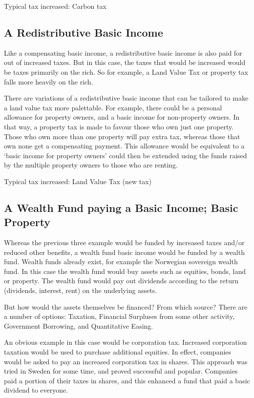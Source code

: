 \documentclass[]{tufte-handout}
\begin{document}
Typical tax increased: Carbon tax

\hypertarget{a-redistributive-basic-income}{%
\subsection{A Redistributive Basic
Income}\label{a-redistributive-basic-income}}

Like a compensating basic income, a redistributive basic income is also
paid for out of increased taxes. But in this case, the taxes that would
be increased would be taxes primarily on the rich. So for example, a
Land Value Tax or property tax falls more heavily on the rich.

There are variations of a redistributive basic income that can be
tailored to make a land value tax more palettable. For example, there
could be a personal allowance for property owners, and a basic income
for non-property owners. In that way, a property tax is made to favour
those who own just one property. Those who own more than one property
will pay extra tax, whereas those that own none get a compensating
payment. This allowance would be equivalent to a `basic income for
property owners' could then be extended using the funds raised by the
multiple property owners to those who are renting.

Typical tax increased: Land Value Tax (new tax)

\hypertarget{a-wealth-fund-paying-a-basic-income-basic-property}{%
\subsection{A Wealth Fund paying a Basic Income; Basic
Property}\label{a-wealth-fund-paying-a-basic-income-basic-property}}

Whereas the previous three example would be funded by increased taxes
and/or reduced other benefits, a wealth fund basic income would be
funded by a wealth fund. Wealth funds already exist, for example the
Norwegian sovereign wealth fund. In this case the wealth fund would buy
assets such as equities, bonds, land or property. The wealth fund would
pay out dividends according to the return (dividends, interest, rent) on
the underlying assets.

But how would the assets themselves be financed? From which source?
There are a number of options: Taxation, Financial Surpluses from some
other activity, Government Borrowing, and Quantitative Easing.

An obvious example in this case would be corporation tax. Increased
corporation taxation would be used to purchase additional equities. In
effect, companies would be asked to pay an increased corporation tax in
shares. This approach was tried in Sweden for some time, and proved
successful and popular. Companies paid a portion of their taxes in
shares, and this enhanced a fund that paid a basic dividend to everyone.
\end{document}
